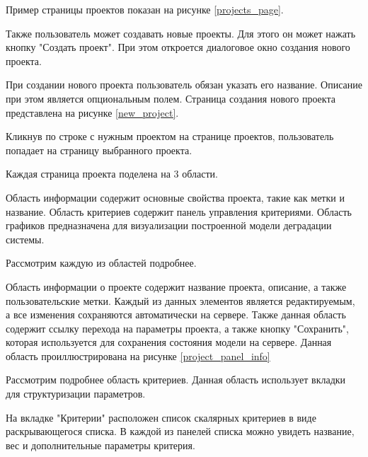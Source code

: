 Пример страницы проектов показан на рисунке \ref{projects_page}.


Также пользователь может создавать новые проекты. 
Для этого он может нажать кнопку "Создать проект". 
При этом откроется диалоговое окно создания нового проекта.

При создании нового проекта пользователь обязан указать его название. Описание при этом является опциональным полем.
Страница создания нового проекта представлена на рисунке \ref{new_project}.


Кликнув по строке с нужным проектом на странице проектов, пользователь попадает на страницу выбранного проекта.

Каждая страница проекта поделена на 3 области.

Область информации содержит основные свойства проекта, такие как метки и название.
Область критериев содержит панель управления критериями. 
Область графиков предназначена для визуализации построенной модели деградации системы.

Рассмотрим каждую из областей подробнее.

Область информации о проекте содержит название проекта, описание, а также пользовательские метки. 
Каждый из данных элементов является редактируемым, а все изменения сохраняются автоматически на сервере.
Также данная область содержит ссылку перехода на параметры проекта, а также кнопку "Сохранить", которая используется для сохранения состояния модели на сервере.
Данная область проиллюстрирована на рисунке \ref{project_panel_info}

 
Рассмотрим подробнее область критериев. Данная область использует вкладки для структуризации параметров.

На вкладке "Критерии" расположен список скалярных критериев в виде раскрывающегося списка. 
В каждой из панелей списка можно увидеть название, вес и дополнительные параметры критерия.

